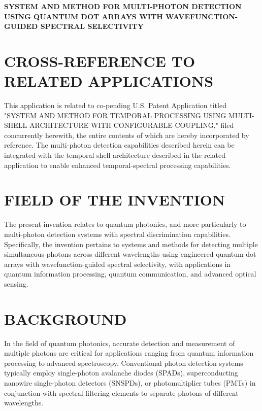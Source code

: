 \documentclass[12pt,letterpaper]{article}
\begin{document}
\begin{center}
\Large\bfseries
SYSTEM AND METHOD FOR MULTI-PHOTON DETECTION USING QUANTUM DOT ARRAYS WITH WAVEFUNCTION-GUIDED SPECTRAL SELECTIVITY
\end{center}

\vspace{0.5in}

\vspace{1in}

\section*{CROSS-REFERENCE TO RELATED APPLICATIONS}

This application is related to co-pending U.S. Patent Application titled "SYSTEM AND METHOD FOR TEMPORAL PROCESSING USING MULTI-SHELL ARCHITECTURE WITH CONFIGURABLE COUPLING," filed concurrently herewith, the entire contents of which are hereby incorporated by reference. The multi-photon detection capabilities described herein can be integrated with the temporal shell architecture described in the related application to enable enhanced temporal-spectral processing capabilities.

\section*{FIELD OF THE INVENTION}

The present invention relates to quantum photonics, and more particularly to multi-photon detection systems with spectral discrimination capabilities. Specifically, the invention pertains to systems and methods for detecting multiple simultaneous photons across different wavelengths using engineered quantum dot arrays with wavefunction-guided spectral selectivity, with applications in quantum information processing, quantum communication, and advanced optical sensing.

\section*{BACKGROUND}

In the field of quantum photonics, accurate detection and measurement of multiple photons are critical for applications ranging from quantum information processing to advanced spectroscopy. Conventional photon detection systems typically employ single-photon avalanche diodes (SPADs), superconducting nanowire single-photon detectors (SNSPDs), or photomultiplier tubes (PMTs) in conjunction with spectral filtering elements to separate photons of different wavelengths.
\end{document}
